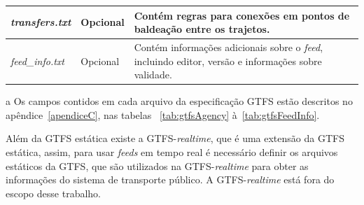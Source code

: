 \documentclass[
	12pt,				%
	oneside,			%
	a4paper,			%
	english,			%
	brazil				%
	]{abntex2ppgsi}
\begin{document}
{{\begin{table}[!htb]
\begin{threeparttable}
\begin{tabular}{>{\centering\arraybackslash}m{3.5cm} | >{\centering}m{3cm} | >{\centering\arraybackslash}m{8cm}}
\hline
\textit{transfers.txt }& Opcional & Contém regras para conexões em pontos de baldeação entre os trajetos. \\
\hline
\textit{feed\_info.txt} & Opcional & Contém informações adicionais sobre o \textit{feed}, incluindo editor, versão e informações sobre validade. \\
\bottomrule
  \end{tabular}
  \begin{tablenotes}
            \item[a] Os campos contidos em cada arquivo da especificação GTFS estão descritos no apêndice~\ref{apendiceC}, nas tabelas ~\ref{tab:gtfsAgency} à~\ref{tab:gtfsFeedInfo}.
        \end{tablenotes}
\end{threeparttable}
\end{table}

Além da GTFS estática existe a GTFS-\textit{realtime}, que é uma extensão da GTFS estática, assim, para usar \textit{feeds} em tempo real é necessário definir os arquivos estáticos da GTFS, que são utilizados na GTFS-\textit{realtime} para obter as informações do sistema de transporte público. A GTFS-\textit{realtime} está fora do escopo desse trabalho.

}}
\end{document}
